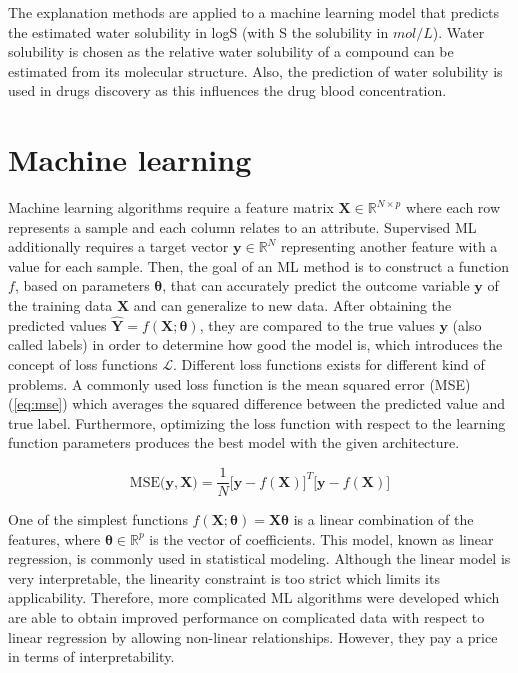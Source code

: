 The explanation methods are applied to a machine learning model that predicts the 
estimated water solubility in logS (with S the solubility in $mol/L$). Water 
solubility is chosen as the relative water solubility of a compound can be estimated 
from its molecular structure. Also, the prediction of water solubility is used 
in drugs discovery as this influences the drug blood concentration.\cite{hill2010getting}


\section{Machine learning}


Machine learning algorithms require a feature matrix $\mathbf{X} \in \mathbb{R}^{N \times p}$
where each row represents a sample and each column relates to an attribute. 
Supervised ML additionally requires a target vector $\pmb{y} \in \mathbb{R}^N$
representing another feature with a value for each sample. Then, the goal of an ML method is 
to construct a function $f$, based on parameters $\pmb{\theta}$, that can accurately 
predict the outcome variable $\pmb{y}$ of the training data $\pmb{X}$ and can 
generalize to new data.\cite{hastie2009elements} After obtaining the predicted 
values $\hat{\pmb{Y}} = f\left(\pmb{X}; \pmb{\theta}\right)$, they are compared 
to the true values $\pmb{y}$ (also called labels)
in order to determine how good the model is, which introduces the concept of loss functions $\mathcal{L}$.
Different loss functions exists for different kind of problems.\cite{wang2020comprehensive}
A commonly used loss function is the mean squared error (MSE) (\cref{eq:mse})
which averages the squared difference between the predicted value and true label.
Furthermore, optimizing the loss function with respect to the learning function
parameters produces the best model with the given architecture.\cite{hastie2009elements}


\begin{equation}
	\label{eq:mse}
	\text{MSE}\big(\pmb{y}, \pmb{X}\big) = \frac{1}{N}  \big[\pmb{y} - f(\mathbf{X})\big]^T[\pmb{y} - f(\mathbf{X})\big]
\end{equation}


One of the simplest functions $f\left(\mathbf{X}; \pmb{\theta}\right) = \mathbf{X}\pmb{\theta}$
is a linear combination of the features, where $\pmb{\theta} \in \mathbb{R}^p$
is the vector of coefficients. This model, known as linear regression, is commonly
used in statistical modeling.\cite{kutner2005applied} Although the linear model is
very interpretable, the linearity constraint is too strict which limits its
applicability. Therefore, more complicated ML algorithms were developed which are
able to obtain improved performance on complicated data with respect to linear
regression by allowing non-linear relationships.\cite{deng2012mnist} However,
they pay a price in terms of interpretability.\cite{fan2021interpretability}


